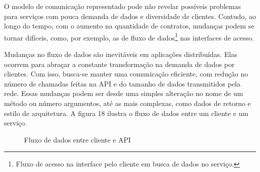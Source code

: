 O modelo de comunicação representado pode não revelar possíveis problemas para serviços com pouca demanda de dados e diversidade de clientes. Contudo, ao longo do tempo, com o aumento na quantidade de contratos, mudanças podem se tornar difíceis, como, por exemplo, as de fluxo de dados\footnote{
  Fluxo de acesso na interface pelo cliente em busca de dados no serviço.
} nas interfaces de acesso.

Mudanças no fluxo de dados são inevitáveis em aplicações distribuídas. Elas ocorrem para abraçar a constante transformação na demanda de dados por clientes. Com isso, busca-se manter uma comunicação eficiente, com redução no número de chamadas feitas na API e do tamanho de dados transmitidos pela rede. Essas mudanças podem ser desde uma simples alteração no nome de um método ou número argumentos, até as mais complexas, como dados de retorno e estilo de arquitetura. A figura 18 ilustra o fluxo de dados entre um cliente e um serviço.

\begin{figure}[H]
  \centering
  \caption{Fluxo de dados entre cliente e API}
\end{figure}

